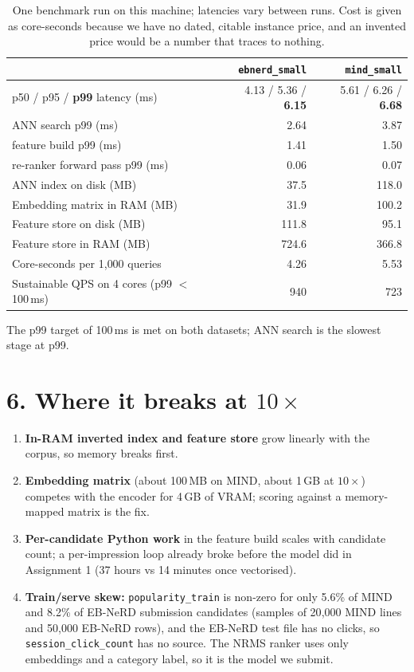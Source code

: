 \documentclass[11pt,a4paper]{article}
\begin{document}
\begin{table}[H]
\centering\small
\begin{tabular}{lrr}
\toprule
 & \texttt{ebnerd\_small} & \texttt{mind\_small} \\
\midrule
p50 / p95 / \textbf{p99} latency (ms) & 4.13 / 5.36 / \textbf{6.15} & 5.61 / 6.26 / \textbf{6.68} \\
\quad ANN search p99 (ms) & 2.64 & 3.87 \\
\quad feature build p99 (ms) & 1.41 & 1.50 \\
\quad re-ranker forward pass p99 (ms) & 0.06 & 0.07 \\
ANN index on disk (MB) & 37.5 & 118.0 \\
Embedding matrix in RAM (MB) & 31.9 & 100.2 \\
Feature store on disk (MB) & 111.8 & 95.1 \\
Feature store in RAM (MB) & 724.6 & 366.8 \\
Core-seconds per 1{,}000 queries & 4.26 & 5.53 \\
Sustainable QPS on 4 cores (p99 $<$ 100\,ms) & 940 & 723 \\
\bottomrule
\end{tabular}
\caption{One benchmark run on this machine; latencies vary between runs. Cost is given as core-seconds because we have no dated, citable instance price, and an invented price would be a number that traces to nothing.}
\end{table}

The p99 target of 100\,ms is met on both datasets; ANN search is the slowest stage at p99.

\section*{6. Where it breaks at $10\times$}

\begin{enumerate}\itemsep0pt
\item \textbf{In-RAM inverted index and feature store} grow linearly with the corpus, so memory breaks first.
\item \textbf{Embedding matrix} (about 100\,MB on MIND, about 1\,GB at $10\times$) competes with the encoder for 4\,GB of VRAM; scoring against a memory-mapped matrix is the fix.
\item \textbf{Per-candidate Python work} in the feature build scales with candidate count; a per-impression loop already broke before the model did in Assignment 1 (37 hours vs 14 minutes once vectorised).
\item \textbf{Train/serve skew:} \texttt{popularity\_train} is non-zero for only 5.6\% of MIND and 8.2\% of EB-NeRD submission candidates (samples of 20{,}000 MIND lines and 50{,}000 EB-NeRD rows), and the EB-NeRD test file has no clicks, so \texttt{session\_click\_count} has no source. The NRMS ranker uses only embeddings and a category label, so it is the model we submit.
\end{enumerate}
\end{document}
